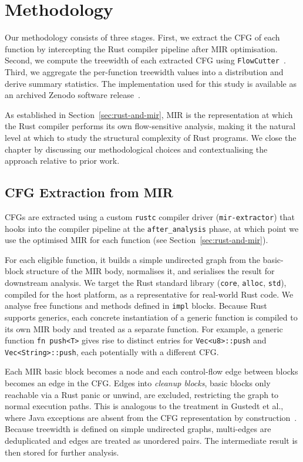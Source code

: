 \section{Methodology}
\label{sec:methodology}

Our methodology consists of three stages.
First, we extract the CFG of each function by intercepting the Rust compiler pipeline after MIR optimisation.
Second, we compute the treewidth of each extracted CFG using \texttt{FlowCutter}~\cite{strasser_2017}.
Third, we aggregate the per-function treewidth values into a distribution and derive summary statistics.
The implementation used for this study is available as an archived Zenodo software release~\cite{repo}.

As established in Section~\ref{sec:rust-and-mir}, MIR is the representation at which the Rust compiler performs its own flow-sensitive analysis, making it the natural level at which to study the structural complexity of Rust programs.
We close the chapter by discussing our methodological choices and contextualising the approach relative to prior work.

\subsection{CFG Extraction from MIR}
\label{subsec:cfg-extraction}

CFGs are extracted using a custom \texttt{rustc} compiler driver (\texttt{mir-extractor}) that hooks into the compiler pipeline at the \texttt{after\_analysis} phase, at which point we use the optimised MIR for each function (see Section~\ref{sec:rust-and-mir}).

For each eligible function, it builds a simple undirected graph from the basic-block structure of the MIR body, normalises it, and serialises the result for downstream analysis.
We target the Rust standard library (\texttt{core}, \texttt{alloc}, \texttt{std}), compiled for the host platform, as a representative for real-world Rust code.
We analyse free functions and methods defined in \texttt{impl} blocks.
Because Rust supports generics, each concrete instantiation of a generic function is compiled to its own MIR body and treated as a separate function.
For example, a generic function \texttt{fn push<T>} gives rise to distinct entries for \texttt{Vec<u8>::push} and \texttt{Vec<String>::push}, each potentially with a different CFG.

Each MIR basic block becomes a node and each control-flow edge between blocks becomes an edge in the CFG.
Edges into \emph{cleanup blocks}, basic blocks only reachable via a Rust panic or unwind, are excluded, restricting the graph to normal execution paths.
This is analogous to the treatment in Gustedt et al., where Java exceptions are absent from the CFG representation by construction~\cite{gustedt_2002}.
Because treewidth is defined on simple undirected graphs, multi-edges are deduplicated and edges are treated as unordered pairs.
The intermediate result is then stored for further analysis.

